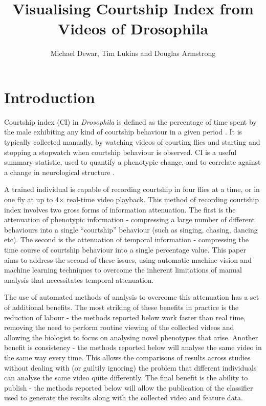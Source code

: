 \documentclass[acmtocl]{acmtrans2m}
\title{Visualising Courtship Index from Videos of Drosophila}
\author{Michael Dewar, Tim Lukins and Douglas Armstrong}
\begin{document}
	
	\maketitle

\section{Introduction}

Courtship index (CI) in \emph{Drosophila} is defined as the percentage of time spent by the male exhibiting any kind of courtship behaviour in a given period \cite{}. It is typically collected manually, by watching videos of courting flies and starting and stopping a stopwatch when courtship behaviour is observed. CI is a useful summary statistic, used to quantify a phenotypic change, and to correlate against a change in neurological structure \cite{}.

A trained individual is capable of recording courtship in four flies at a time, or in one fly at up to 4$\times$ real-time video playback. This method of recording courtship index involves two gross forms of information attenuation. 
The first is the attenuation of phenotypic information - compressing a large number of different behaviours into a single ``courtship'' behaviour (such as singing, chasing, dancing etc). 
The second is the attenuation of temporal information - compressing the time course of courtship behaviour into a single percentage value. 
This paper aims to address the second of these issues, using automatic machine vision and machine learning techniques to overcome the inherent limitations of manual analysis that necessitates temporal attenuation.

The use of automated methods of analysis to overcome this attenuation has a set of additional benefits. 
The most striking of these benefits in practice is the reduction of labour - the methods reported below work faster than real time, removing the need to perform routine viewing of the collected videos and allowing the biologist to focus on analysing novel phenotypes that arise. 
Another benefit is consistency - the methods reported below will analyse the same video in the same way every time. This allows the comparisons of results across studies without dealing with (or guiltily ignoring) the problem that different individuals can analyse the same video quite differently. 
The final benefit is the ability to publish - the methods reported below will allow the publication of the classifier used to generate the results along with the collected video and feature data. 
\end{document}
